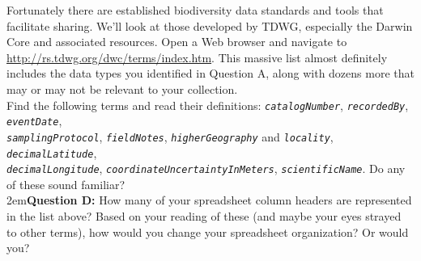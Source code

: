 \documentclass[11pt,letterpaper]{article}
\newcommand{\latinword}[1]{\texttt{\itshape #1}}%
\begin{document}
\noindent{}Fortunately there are established biodiversity data standards and tools that facilitate sharing. We'll look at those developed by TDWG, especially the Darwin Core and associated resources. Open a Web browser and navigate to \url{http://rs.tdwg.org/dwc/terms/index.htm}. This massive list almost definitely includes the data types you identified in Question A, along with dozens more that may or may not be relevant to your collection.\\

\noindent{}Find the following terms and read their definitions: \latinword{catalogNumber}, \latinword{recordedBy}, \latinword{eventDate},\\ \latinword{samplingProtocol}, \latinword{fieldNotes}, \latinword{higherGeography} and \latinword{locality}, \latinword{decimalLatitude},\\ \latinword{decimalLongitude}, \latinword{coordinateUncertaintyInMeters}, \latinword{scientificName}. Do any of these sound familiar?\\

\hangindent2em\textbf{Question D:} How many of your spreadsheet column headers are represented in the list above? Based on your reading of these (and maybe your eyes strayed to other terms), how would you change your spreadsheet organization? Or would you?\\
\end{document}
